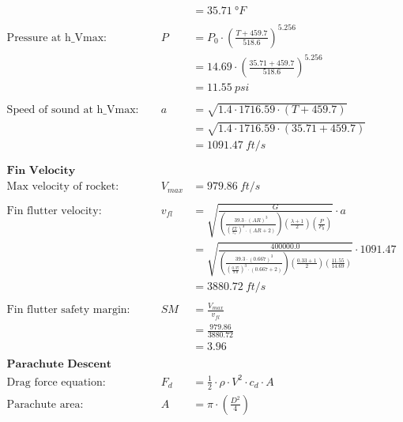 \documentclass{article}
\begin{document}
\begin{align*}
		&& &= \SI{35.71}{\degree F} \\ \\
		\text{Pressure at h\_Vmax:}& &P &= P_{0} \cdot \left(\frac{T + 459.7}{ 518.6 }\right)^{5.256} \tag{eqn.6} \\
		&& &= 14.69\cdot \left(\frac{35.71 + 459.7 }{ 518.6 }\right)^{5.256} \\
		&& &= \SI{11.55}{psi} \\ \\
		\text{Speed of sound at h\_Vmax: }& &a &= \sqrt { 1.4 \cdot 1716.59 \cdot \left(T + 459.7 \right) } \tag{eqn. 7}\\&& &= \sqrt { 1.4 \cdot 1716.59 \cdot \left(35.71 + 459.7 \right) } \\
		&& &= \SI{1091.47}{ft/s} \\ \\
		\\
		\textbf{Fin Velocity Calculations} \\
		\text{Max velocity of rocket:}& &V_{max} &= \SI{979.86}{ft/s} \\ \\
		\text{Fin flutter velocity:}& &v_{fl} &= \sqrt {\frac{ G }{\left( \frac{ 39.3 \cdot \left( AR \right) ^{ 3 } }{ \left( \frac{ FT }{ c_{r} } \right) ^{ 3 } \cdot \left( AR + 2 \right) } \right) \left( \frac{ \lambda + 1 }{ 2 } \right) \left( \frac{ P }{ P_{0} } \right) } } \cdot a \tag{eqn. 8} \\&& &= \sqrt { \frac{400000.0}{ \left( \frac{ 39.3 \cdot \left(0.667 \right) ^{ 3 } }{ \left( \frac{0.37}{9.0} \right) ^{3} \cdot \left(0.667 + 2 \right) } \right) \left( \frac{0.33+ 1 }{ 2 } \right) \left( \frac{11.55}{14.69} \right) } } \cdot 1091.47\\&& &= \SI{3880.72}{ft/s} \\ \\
		\text{Fin flutter safety margin:}& &SM &= \frac{V_{max}}{v_{fl}} \tag{eqn. 9} \\&& &= \frac{979.86}{3880.72} \\
		&& &= 3.96\\
		\\
		\textbf{Parachute Descent Velocity Equation Proof} \\
		\text{Drag force equation:}& &F_{d} &= \frac{1}{2} \cdot \rho \cdot V^{2} \cdot c_{d} \cdot A \tag{eqn. 10} \\
		\text{Parachute area:}& &A &= \pi \cdot \left( \frac{D^{2}}{4} \right) \\

\end{align*}
\end{document}
